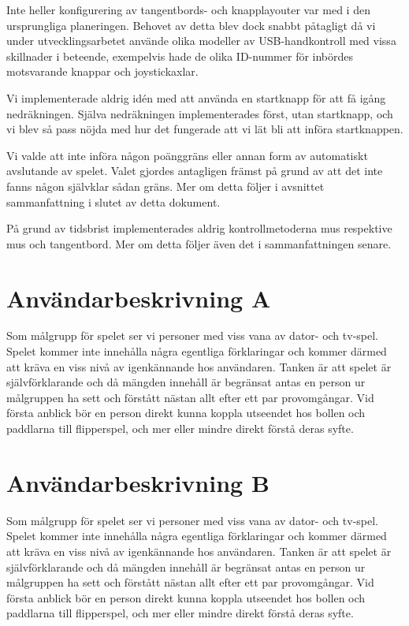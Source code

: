 \documentclass[a4paper,11pt]{article}
\begin{document}
Inte heller konfigurering av tangentbords- och knapplayouter var med i den ursprungliga planeringen.
Behovet av detta blev dock snabbt påtagligt då vi under utvecklingsarbetet använde olika modeller av
USB-handkontroll med vissa skillnader i beteende, exempelvis hade de olika ID-nummer för inbördes
motsvarande knappar och joystickaxlar.

Vi implementerade aldrig idén med att använda en startknapp för att få igång nedräkningen. Själva
nedräkningen implementerades först, utan startknapp, och vi blev så pass nöjda med hur det fungerade
att vi lät bli att införa startknappen.

\bigskip
\noindent
Vi valde att inte införa någon poänggräns eller annan form av automatiskt avslutande av spelet.
Valet gjordes antagligen främst på grund av att det inte fanns någon självklar sådan gräns. Mer om
detta följer i avsnittet sammanfattning i slutet av detta dokument.

På grund av tidsbrist implementerades aldrig kontrollmetoderna mus respektive mus och tangentbord.
Mer om detta följer även det i sammanfattningen senare.

\section{Användarbeskrivning A}
Som målgrupp för spelet ser vi personer med viss vana av dator- och tv-spel. Spelet kommer
inte innehålla några egentliga förklaringar och kommer därmed att kräva en viss nivå av
igenkännande hos användaren. Tanken är att spelet är självförklarande och då mängden innehåll
är begränsat antas en person ur målgruppen ha sett och förstått nästan allt efter ett par
provomgångar. Vid första anblick bör en person direkt kunna koppla utseendet hos bollen och
paddlarna till flipperspel, och mer eller mindre direkt förstå deras syfte.

\section{Användarbeskrivning B}
Som målgrupp för spelet ser vi personer med viss vana av dator- och tv-spel. Spelet kommer inte
innehålla några egentliga förklaringar och kommer därmed att kräva en viss nivå av igenkännande hos
användaren. Tanken är att spelet är självförklarande och då mängden innehåll är begränsat antas en
person ur målgruppen ha sett och förstått nästan allt efter ett par provomgångar. Vid första anblick
bör en person direkt kunna koppla utseendet hos bollen och paddlarna till flipperspel, och mer eller
mindre direkt förstå deras syfte.
\end{document}
